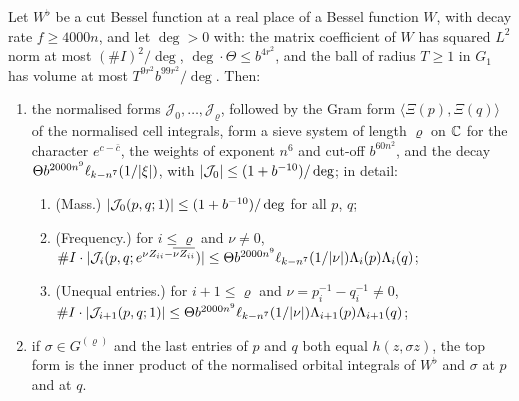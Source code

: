 \begin{theorem}\label{thm:local-band-limits}
Let $W^\flat$ be a cut Bessel function at a real place of a Bessel function $W$, with decay rate $f\ge4000n$, and let $\deg>0$ with: the matrix coefficient of $W$ has squared $L^2$ norm at most $(\#I)^2/\deg$,
$\deg\cdot\Theta\le b^{4r^2}$, and the ball of radius $T\ge1$ in $G_1$ has volume at most $T^{9r^2}b^{99r^2}/\deg$. Then:
\begin{enumerate}[label=\textup{(\alph*)}]
\item the normalised forms $\mathcal J_0,\dots,\mathcal J_\varrho$, followed by the Gram form $\langle\Xi(p),\Xi(q)\rangle$ of the normalised cell integrals, form a sieve system of length $\varrho$ on $\mathbb{C}$ for the character $e^{c-\bar c}$, the
weights of exponent $n^6$ and cut-off $b^{60n^2}$, and the decay $\Theta b^{2000n^9}\ell_{k-n^7}(1/\lvert \xi\rvert)$, with $\lvert \mathcal J_0\rvert\le(1+b^{-10})/\deg$; in detail:
\begin{enumerate}[label=\textup{(\roman*)}]
\item (Mass.) $\lvert \mathcal J_0(p,q;1)\rvert\le(1+b^{-10})/\deg$ for all $p$, $q$;
\item (Frequency.) for $i\le\varrho$ and $\nu\ne0$, $\#I\cdot\lvert \mathcal J_i(p,q;e^{\nu Z_{ii}-\overline{\nu Z_{ii}}})\rvert\le\Theta b^{2000n^9}\ell_{k-n^7}(1/\lvert \nu\rvert)\Lambda_i(p)\Lambda_i(q)$;
\item (Unequal entries.) for $i+1\le\varrho$ and $\nu=p_i^{-1}-q_i^{-1}\ne0$, $\#I\cdot\lvert \mathcal J_{i+1}(p,q;1)\rvert\le\Theta b^{2000n^9}\ell_{k-n^7}(1/\lvert \nu\rvert)\Lambda_{i+1}(p)\Lambda_{i+1}(q)$;
\end{enumerate}
\item if $\sigma\in G^{(\varrho)}$ and the last entries of $p$ and $q$ both equal $h(z,\sigma z)$, the top form is the inner product of the normalised orbital integrals of $W^\flat$ and $\sigma$ at $p$ and at $q$.
\end{enumerate}
\end{theorem}
